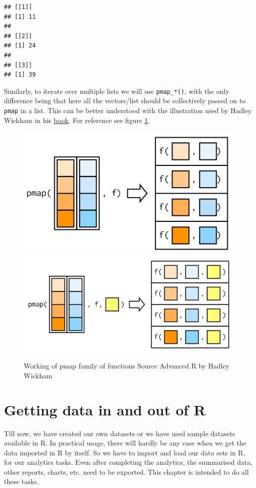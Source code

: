 \documentclass[
]{book}
\begin{document}
\begin{verbatim}
## [[1]]
## [1] 11
## 
## [[2]]
## [1] 24
## 
## [[3]]
## [1] 39
\end{verbatim}

Similarly, to iterate over multiple lists we will use \texttt{pmap\_*()}, with the only difference being that here all the vectors/list should be collectively passed on to \texttt{pmap} in a list. This can be better understood with the illustration used by Hadley Wickham in his \href{https://adv-r.hadley.nz/functionals.html}{book}. For reference see figure \ref{fig:pmap}.

\begin{figure}

{\centering \includegraphics[width=0.49\linewidth]{images/pmap} \includegraphics[width=0.49\linewidth]{images/pmap-arg} 

}

\caption{Working of pmap family of functions \hspace{\textwidth} Source Advanced R by Hadley Wickham}\label{fig:pmap}
\end{figure}

\hypertarget{read}{%
\chapter{Getting data in and out of R}\label{read}}

Till now, we have created our own datasets or we have used sample datasets available in R. In practical usage, there will hardly be any case when we get the data imported in R by itself. So we have to import and load our data sets in R, for our analytics tasks. Even after completing the analytics, the summarised data, other reports, charts, etc. need to be exported. This chapter is intended to do all these tasks.
\end{document}
